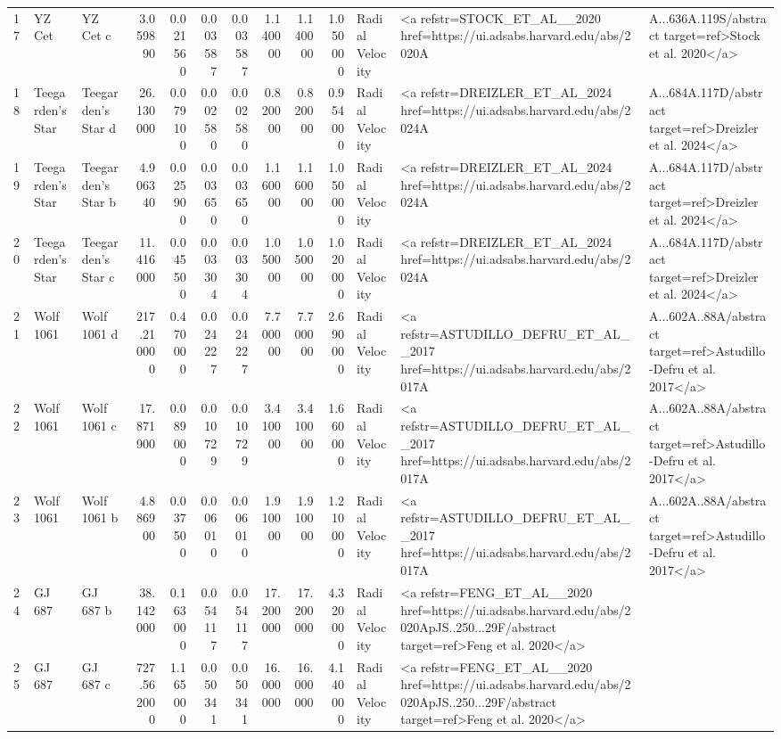 \begin{tabular}{lllrrrrrrrll}
17 & YZ Cet & YZ Cet c & 3.059890 & 0.021560 & 0.003587 & 0.003587 & 1.140000 & 1.140000 & 1.050000 & Radial Velocity & <a refstr=STOCK_ET_AL__2020 href=https://ui.adsabs.harvard.edu/abs/2020A&A...636A.119S/abstract target=ref>Stock et al. 2020</a> \\
18 & Teegarden's Star & Teegarden's Star d & 26.130000 & 0.079100 & 0.002580 & 0.002580 & 0.820000 & 0.820000 & 0.954000 & Radial Velocity & <a refstr=DREIZLER_ET_AL_2024 href=https://ui.adsabs.harvard.edu/abs/2024A&A...684A.117D/abstract target=ref>Dreizler et al. 2024</a> \\
19 & Teegarden's Star & Teegarden's Star b & 4.906340 & 0.025900 & 0.003650 & 0.003650 & 1.160000 & 1.160000 & 1.050000 & Radial Velocity & <a refstr=DREIZLER_ET_AL_2024 href=https://ui.adsabs.harvard.edu/abs/2024A&A...684A.117D/abstract target=ref>Dreizler et al. 2024</a> \\
20 & Teegarden's Star & Teegarden's Star c & 11.416000 & 0.045500 & 0.003304 & 0.003304 & 1.050000 & 1.050000 & 1.020000 & Radial Velocity & <a refstr=DREIZLER_ET_AL_2024 href=https://ui.adsabs.harvard.edu/abs/2024A&A...684A.117D/abstract target=ref>Dreizler et al. 2024</a> \\
21 & Wolf 1061 & Wolf 1061 d & 217.210000 & 0.470000 & 0.024227 & 0.024227 & 7.700000 & 7.700000 & 2.690000 & Radial Velocity & <a refstr=ASTUDILLO_DEFRU_ET_AL__2017 href=https://ui.adsabs.harvard.edu/abs/2017A&A...602A..88A/abstract target=ref>Astudillo-Defru et al. 2017</a> \\
22 & Wolf 1061 & Wolf 1061 c & 17.871900 & 0.089000 & 0.010729 & 0.010729 & 3.410000 & 3.410000 & 1.660000 & Radial Velocity & <a refstr=ASTUDILLO_DEFRU_ET_AL__2017 href=https://ui.adsabs.harvard.edu/abs/2017A&A...602A..88A/abstract target=ref>Astudillo-Defru et al. 2017</a> \\
23 & Wolf 1061 & Wolf 1061 b & 4.886900 & 0.037500 & 0.006010 & 0.006010 & 1.910000 & 1.910000 & 1.210000 & Radial Velocity & <a refstr=ASTUDILLO_DEFRU_ET_AL__2017 href=https://ui.adsabs.harvard.edu/abs/2017A&A...602A..88A/abstract target=ref>Astudillo-Defru et al. 2017</a> \\
24 & GJ 687 & GJ 687 b & 38.142000 & 0.163000 & 0.054117 & 0.054117 & 17.200000 & 17.200000 & 4.320000 & Radial Velocity & <a refstr=FENG_ET_AL__2020 href=https://ui.adsabs.harvard.edu/abs/2020ApJS..250...29F/abstract target=ref>Feng et al. 2020</a> \\
25 & GJ 687 & GJ 687 c & 727.562000 & 1.165000 & 0.050341 & 0.050341 & 16.000000 & 16.000000 & 4.140000 & Radial Velocity & <a refstr=FENG_ET_AL__2020 href=https://ui.adsabs.harvard.edu/abs/2020ApJS..250...29F/abstract target=ref>Feng et al. 2020</a> \\

\end{tabular}
